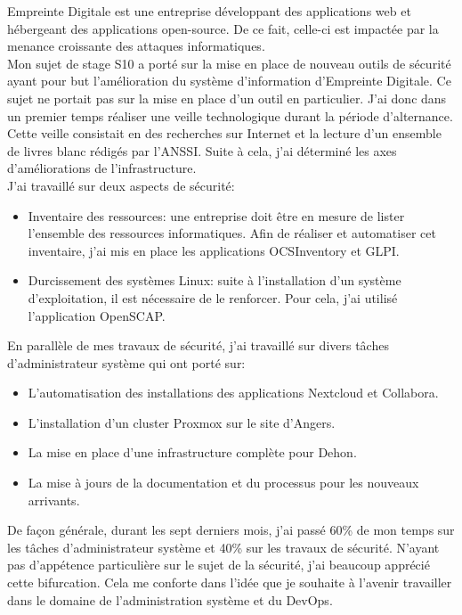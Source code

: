 \documentclass[12pt, a4paper, twoside]{article}
\begin{document}
Empreinte Digitale est une entreprise développant des applications web et hébergeant des applications open-source.
De ce fait, celle-ci est impactée par la menance croissante des attaques informatiques.\\

Mon sujet de stage S10 a porté sur la mise en place de nouveau outils de sécurité ayant pour but l'amélioration du système d'information d'Empreinte Digitale.
Ce sujet ne portait pas sur la mise en place d'un outil en particulier.
J'ai donc dans un premier temps réaliser une veille technologique durant la période d'alternance.
Cette veille consistait en des recherches sur Internet et la lecture d'un ensemble de livres blanc rédigés par l'\gls{ANSSI}.
Suite à cela, j'ai déterminé les axes d'améliorations de l'infrastructure. \\

J'ai travaillé sur deux aspects de sécurité: 
\begin{itemize}
    \item Inventaire des ressources: une entreprise doit être en mesure de lister l'ensemble des ressources informatiques.
    Afin de réaliser et automatiser cet inventaire, j'ai mis en place les applications \gls{OCSInventory} et \gls{GLPI}.
    \item Durcissement des systèmes \gls{Linux}: suite à l'installation d'un système d'exploitation, il est nécessaire de le renforcer.
    Pour cela, j'ai utilisé l'application \gls{OpenSCAP}.
\end{itemize} 

En parallèle de mes travaux de sécurité, j'ai travaillé sur divers tâches d'administrateur système qui ont porté sur:
\begin{itemize}
    \item L'automatisation des installations des applications \gls{Nextcloud} et \gls{Collabora}.
    \item L'installation d'un cluster \gls{Proxmox} sur le site d'Angers.
    \item La mise en place d'une infrastructure complète pour Dehon.
    \item La mise à jours de la documentation et du processus pour les nouveaux arrivants.
\end{itemize} 

De façon générale, durant les sept derniers mois, j'ai passé 60\% de mon temps sur les tâches d'administrateur système et 40\% sur les travaux de sécurité.
N'ayant pas d'appétence particulière sur le sujet de la sécurité, j'ai beaucoup apprécié cette bifurcation.
Cela me conforte dans l'idée que je souhaite à l'avenir travailler dans le domaine de l'administration système et du \gls{DevOps}.\\
\end{document}
